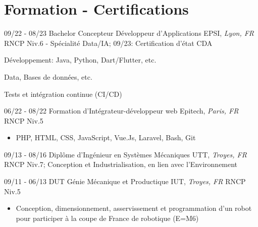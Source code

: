 \documentclass[]{friggeri-cv}
\begin{document}
\vspace*{-0.5cm}
\vspace*{0.45cm}
\section{Formation - Certifications}
\vspace*{-0.25cm}
\vspace{0.5mm}
\begin{entrylist}
  \entry
    {09/22 - 08/23}
    {Bachelor Concepteur Développeur d'Applications}
    {EPSI, \textit{Lyon, FR}}
    {RNCP Niv.6 - Spécialité Data/IA; \hspace{7mm} 09/23: Certification d'état CDA}
\end{entrylist}
\vspace*{-0.65cm}
\begin{itemize}
\setlength{\itemsep}{1pt}
\setlength{\parskip}{0pt}
\setlength{\parsep}{0pt}
\begin{multicols}{2}
\item Développement: \newline Java, Python, Dart/Flutter, etc.
\columnbreak
\item Data, Bases de données, etc.
\item Tests et intégration continue (CI/CD)
\end{multicols}
\end{itemize}\vspace{0.5mm}
\begin{entrylist}
  \entry
    {06/22 - 08/22}
    {Formation d'Intégrateur-développeur web}
    {Epitech, \textit{Paris, FR}}
    {RNCP Niv.5}
\end{entrylist}

\vspace*{-0.35cm}
\begin{itemize}
\setlength{\itemsep}{1pt}
\setlength{\parskip}{0pt}
\setlength{\parsep}{0pt}

\item PHP, HTML, CSS, JavaScript, Vue.Js, Laravel, Bash, Git
\end{itemize}\vspace{0.5mm}
\begin{entrylist}
  \entry
    {09/13 - 08/16}
    {Diplôme d'Ingénieur en Systèmes Mécaniques}
    {UTT, \textit{Troyes, FR}}
    {RNCP Niv.7; Conception et Industrialisation, en lien avec l’Environnement}
\end{entrylist}
\vspace{0.5mm}
\begin{entrylist}
  \entry
    {09/11 - 06/13}
    {DUT Génie Mécanique et Productique}
    {IUT, \textit{Troyes, FR}}
    {RNCP Niv.5}
\end{entrylist}
\vspace*{-0.4cm}
\begin{itemize}
\setlength{\itemsep}{1pt}
\setlength{\parskip}{0pt}
\setlength{\parsep}{0pt}
\item Conception, dimensionnement, asservissement et programmation d’un robot pour participer à la coupe de France de robotique (E=M6)
\end{itemize}
\end{document}
